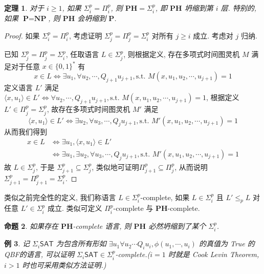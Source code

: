 \documentclass[8pt]{article}
\theoremstyle{compact}
\newtheorem{theorem}{定理}[section]
\newtheorem{proposition}[theorem]{命题}
\newtheorem{example}[theorem]{例}
\def\le{\leqslant}
\def\ge{\geqslant}
\def\P{\textbf{P}}
\def\NP{\textbf{NP}}
\def\PH{\textbf{PH}}
\begin{document}
\begin{theorem}
	对于 $i \ge 1$, 如果 $\Sigma_i^p = \Pi_i^p$, 则 $\PH = \Sigma_i^p$, 即 $\PH$ 坍缩到第 $i$ 层. 特别的, 如果 $\P = \NP$, 则 $\PH$ 会坍缩到 $\P$. 
\end{theorem}
\begin{proof}
	如果 $\Sigma_i^p = \Pi_i^p$, 考虑证明 $\Sigma_j^p = \Pi_j^p = \Sigma_i^p$ 对所有 $j \ge i$ 成立. 考虑对 $j$ 归纳.

	已知 $\Sigma_j^p = \Pi_j^p = \Sigma_i^p$, 任取语言 $L \in \Sigma_j^p$, 则根据定义, 存在多项式时间图灵机 $M$ 满足对于任意 $x \in \{0, 1\}^*$ 有 $$x \in L \Leftrightarrow \exists u_1, \forall u_2, \cdots, Q_{j+1} u_{j+1}, \text{s.t. } M(x, u_1, u_2, \cdots, u_{j+1}) = 1$$
	定义语言 $L'$ 满足 $\langle x, u_1 \rangle \in L' \Leftrightarrow \forall u_2, \cdots, Q_{j+1} u_{j+1}, \text{s.t. } M(x, u_1, u_2, \cdots, u_{j+1}) = 1$, 根据定义 $L' \in \Pi_j^p = \Sigma_j^p$, 故存在多项式时间图灵机 $M'$ 满足$$\langle x, u_1 \rangle \in L' \Leftrightarrow \exists u_2, \forall u_3, \cdots, Q_j u_{j+1}, \text{s.t. } M'(x, u_1, u_2, \cdots, u_{j+1}) = 1$$
	从而我们得到 \begin{equation*}
		\begin{split}
			x \in L &\Leftrightarrow \exists u_1, \langle x, u_1 \rangle \in L' \\
			&\Leftrightarrow \exists u_1, \exists u_2, \forall u_3, \cdots, Q_j u_{j+1}, \text{s.t. } M'(x, u_1, u_2, \cdots, u_{j+1}) = 1
		\end{split}
	\end{equation*}
	故 $L \in \Sigma_j^p$, 于是 $\Sigma_{j+1}^p \subseteq \Sigma_j^p$, 类似地可证明$\Pi_{j+1}^p \subseteq \Pi_j^p$, 从而说明 $\Sigma_{j+1}^p = \Pi_{j+1}^p = \Sigma_i^p$.
\end{proof}


类似之前完全性的定义, 我们称语言 $L \in \Sigma_i^p$-complete, 如果 $L \in \Sigma_i^p$ 且 $L' \le_p L$ 对任意 $L' \in \Sigma_i^p$ 成立. 类似可定义 $\Pi_i^p$-complete 与 $\PH$-complete.

\begin{proposition}
	如果存在 $\PH$-complete 语言, 则 $\PH$ 必然坍缩到了某个 $\Sigma_i^p$.
\end{proposition}

\begin{example}
	记 $\Sigma_i\textsf{SAT}$ 为包含所有形如 $\exists u_1 \forall u_2 \cdots Q_iu_i, \phi(u_1, \cdots, u_i)$ 的真值为 True 的 QBF的语言, 可以证明 $\Sigma_i\textsf{SAT} \in \Sigma_i^p$-complete.($i = 1$ 时就是 Cook Levin Theorem, $i > 1$ 时也可采用类似方法证明.)
\end{example}
\end{document}
